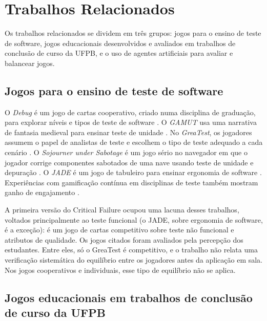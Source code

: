 \section{Trabalhos Relacionados}
\label{sec:relacionados}

Os trabalhos relacionados se dividem em três grupos: jogos para o ensino de teste de software, jogos
educacionais desenvolvidos e avaliados em trabalhos de conclusão de curso da UFPB, e o uso de agentes
artificiais para avaliar e balancear jogos.

\subsection{Jogos para o ensino de teste de software}

O \emph{Debug} é um jogo de cartas cooperativo, criado numa disciplina de graduação, para explorar níveis e
tipos de teste de software \cite{costa2024debug}. O \emph{GAMUT} usa uma narrativa de fantasia medieval para
ensinar teste de unidade \cite{gomes2021gamut}. No \emph{GreaTest}, os jogadores assumem o papel de analistas de
teste e escolhem o tipo de teste adequado a cada cenário \cite{beppe2018greatest}. O \emph{Sojourner under
Sabotage} é um jogo sério no navegador em que o jogador corrige componentes sabotados de uma nave usando teste
de unidade e depuração \cite{straubinger2025sojourner}. O \emph{JADE} é um jogo de tabuleiro para ensinar
ergonomia de software \cite{jeandaubias2023jade}. Experiências com gamificação contínua em disciplinas de teste
também mostram ganho de engajamento \cite{straubinger2024ci,jesus2020,blanco2023}.

A primeira versão do Critical Failure \cite{oliveira2025critical} ocupou uma lacuna desses trabalhos, voltados
principalmente ao teste funcional (o JADE, sobre ergonomia de software, é a exceção): é um jogo de
cartas competitivo sobre teste não funcional e atributos de qualidade. Os jogos citados foram avaliados pela
percepção dos estudantes. Entre eles, só o GreaTest é competitivo, e o trabalho não relata uma
verificação sistemática do equilíbrio entre os jogadores antes da aplicação em sala. Nos jogos cooperativos e
individuais, esse tipo de equilíbrio não se aplica.

\subsection{Jogos educacionais em trabalhos de conclusão de curso da UFPB}

